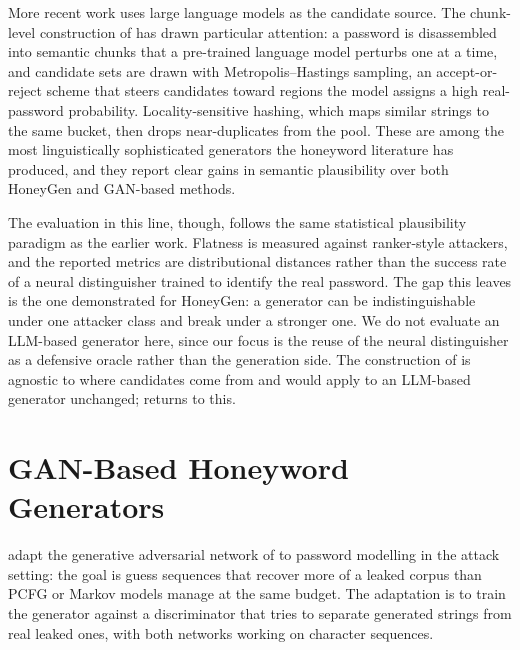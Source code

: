 More recent work uses large language models as the candidate source.
The chunk-level construction of \textcite{yu2023honeychunk} has drawn
particular attention: a password is disassembled into semantic chunks
that a pre-trained language model perturbs one at a time, and candidate
sets are drawn with Metropolis--Hastings sampling, an accept-or-reject
scheme that steers candidates toward regions the model assigns a high
real-password probability. Locality-sensitive hashing, which maps
similar strings to the same bucket, then drops near-duplicates from the
pool. These are among the most linguistically sophisticated generators
the honeyword literature has produced, and they report clear gains in
semantic plausibility over both HoneyGen and GAN-based methods.

The evaluation in this line, though, follows the same statistical
plausibility paradigm as the earlier work. Flatness is measured against
ranker-style attackers, and the reported metrics are distributional
distances rather than the success rate of a neural distinguisher trained
to identify the real password. The gap this leaves is the one
\textcite{dani2024passfilter} demonstrated for HoneyGen: a generator can
be indistinguishable under one attacker class and break under a stronger
one. We do not evaluate an LLM-based generator here, since our focus is
the reuse of the neural distinguisher as a defensive oracle rather than
the generation side. The construction of  is
agnostic to where candidates come from and would apply to an LLM-based
generator unchanged;  returns to this.

\section{GAN-Based Honeyword Generators}
\label{sec:related-gan}

\textcite{hitaj2019passgan} adapt the generative adversarial network of
\textcite{goodfellow2014generative} to password modelling in the attack
setting: the goal is guess sequences that recover more of a leaked
corpus than PCFG or Markov models manage at the same budget. The
adaptation is to train the generator against a discriminator that tries
to separate generated strings from real leaked ones, with both networks
working on character sequences.

